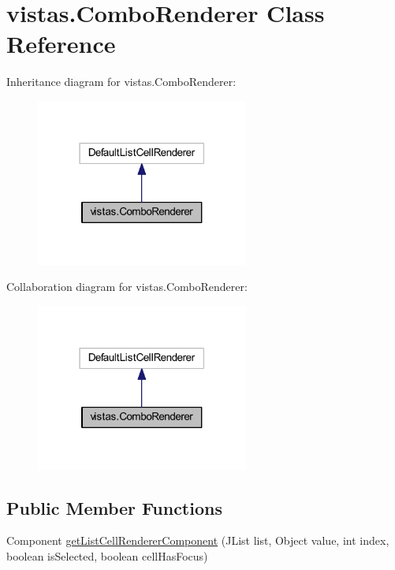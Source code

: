 \hypertarget{classvistas_1_1_combo_renderer}{}\section{vistas.\+Combo\+Renderer Class Reference}
\label{classvistas_1_1_combo_renderer}


Inheritance diagram for vistas.\+Combo\+Renderer\+:
\nopagebreak
\begin{figure}[H]
\begin{center}
\leavevmode
\includegraphics[width=198pt]{classvistas_1_1_combo_renderer__inherit__graph}
\end{center}
\end{figure}


Collaboration diagram for vistas.\+Combo\+Renderer\+:
\nopagebreak
\begin{figure}[H]
\begin{center}
\leavevmode
\includegraphics[width=198pt]{classvistas_1_1_combo_renderer__coll__graph}
\end{center}
\end{figure}
\subsection*{Public Member Functions}
\begin{DoxyCompactItemize}
\item 
Component \mbox{\hyperlink{classvistas_1_1_combo_renderer_aa9ff9990a50ba210eb3a366c1e18f58b}{get\+List\+Cell\+Renderer\+Component}} (J\+List list, Object value, int index, boolean is\+Selected, boolean cell\+Has\+Focus)
\end{DoxyCompactItemize}


